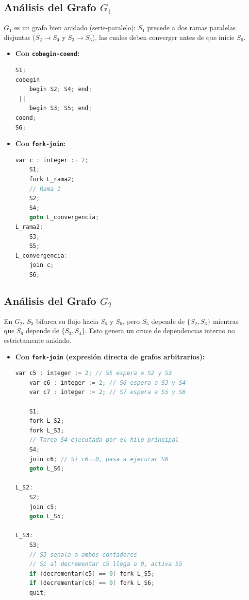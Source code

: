 \documentclass[11pt,a4paper,twoside,openright]{report}
\begin{document}
\begin{solucion}
\subsection*{Análisis del Grafo $G_1$}
$G_1$ es un grafo bien anidado (serie-paralelo): $S_1$ precede a dos ramas paralelas disjuntas ($S_2 \to S_4$ y $S_3 \to S_5$), las cuales deben converger antes de que inicie $S_6$.
\begin{itemize}[leftmargin=*]
    \item \textbf{Con \texttt{cobegin-coend}:}
\begin{lstlisting}[language=C++]
S1;
cobegin
    begin S2; S4; end;
 ||
    begin S3; S5; end;
coend;
S6;
\end{lstlisting}

    \item \textbf{Con \texttt{fork-join}:}
\begin{lstlisting}[language=C++]
    var c : integer := 2;
    S1;
    fork L_rama2;
    // Rama 1
    S2;
    S4;
    goto L_convergencia;
L_rama2:
    S3;
    S5;
L_convergencia:
    join c;
    S6;
\end{lstlisting}
\end{itemize}

\subsection*{Análisis del Grafo $G_2$}
En $G_2$, $S_3$ bifurca su flujo hacia $S_5$ y $S_6$, pero $S_5$ depende de $\{S_2, S_3\}$ mientras que $S_6$ depende de $\{S_3, S_4\}$. Esto genera un cruce de dependencias interno no estrictamente anidado.
\begin{itemize}[leftmargin=*]
    \item \textbf{Con \texttt{fork-join} (expresión directa de grafos arbitrarios):}
\begin{lstlisting}[language=C++]
    var c5 : integer := 2; // S5 espera a S2 y S3
    var c6 : integer := 2; // S6 espera a S3 y S4
    var c7 : integer := 2; // S7 espera a S5 y S6

    S1;
    fork L_S2;
    fork L_S3;
    // Tarea S4 ejecutada por el hilo principal
    S4;
    join c6; // Si c6==0, pasa a ejecutar S6
    goto L_S6;

L_S2:
    S2;
    join c5;
    goto L_S5;

L_S3:
    S3;
    // S3 senala a ambos contadores
    // Si al decrementar c5 llega a 0, activa S5
    if (decrementar(c5) == 0) fork L_S5;
    if (decrementar(c6) == 0) fork L_S6;
    quit;


\end{lstlisting}
\end{itemize}
\end{solucion}
\end{document}
